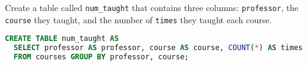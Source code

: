 \question Create a table called \lstinline$num_taught$ that contains three
columns: \lstinline$professor$, the \lstinline$course$ they taught, and the
number of \lstinline$times$ they taught each course.

\begin{solution}[1in]
\begin{lstlisting}[language=SQL]
CREATE TABLE num_taught AS
  SELECT professor AS professor, course AS course, COUNT(*) AS times
  FROM courses GROUP BY professor, course;
\end{lstlisting}
\end{solution}
